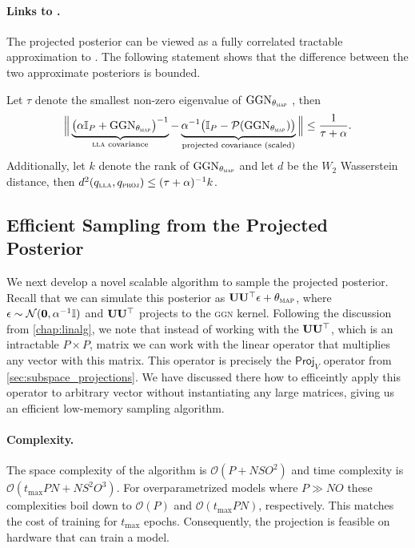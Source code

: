 \paragraph{Links to \LLA.}
The projected posterior can be viewed as a fully correlated tractable approximation to \LLA. The following statement shows that the difference between the two approximate posteriors is bounded.
\begin{lemma}\label{lm:null:error_bound}
   Let $\tau$ denote the smallest non-zero eigenvalue of $\mathrm{GGN}_{\theta_{\textsc{map}}}$ \citep{nguyen2021tight}, then
\begin{equation*}
    \Big\|
    \underbrace{\big(\alpha \mathbb{I}_P + \mathrm{GGN}_{\theta_{\textsc{map}}}\big)^{-1}}_{\textnormal{\textsc{lla}\ covariance}}
    -
    \underbrace{\alpha^{-1}\big(\mathbb{I}_P - \mathcal{P}(\mathrm{GGN}_{\theta_{\textsc{map}}})\big)}_{\textnormal{projected covariance (scaled)}}
    \Big\|
    \leq
    \frac{1}{\tau + \alpha}.
\end{equation*}
Additionally, let $k$ denote the rank of $\mathrm{GGN}_{\theta_{\textsc{map}}}$ and let $d$ be the $W_2$ Wasserstein distance, then $d^2(q_{\textnormal{\textsc{lla}}}, q_{\textnormal{\textsc{proj}}}) \leq (\tau + \alpha)^{-1} k$.
\end{lemma}

\subsection{Efficient Sampling from the Projected Posterior}

We next develop a novel scalable algorithm to sample the projected posterior.
Recall that we can simulate this posterior as $\mathbf{U} \mathbf{U}^{\top} \epsilon + \theta_{\textnormal{\textsc{map}}}$, where $\epsilon \sim \mathcal{N}(\mathbf{0}, \alpha^{-1}\mathbb{I})$ and $\mathbf{U}\mathbf{U}^{\top}$ projects to the \textsc{ggn} kernel. Following the discussion from \cref{chap:linalg}, we note that instead of working with the $\mathbf{U}\mathbf{U}^{\top} $, which is an intractable $P \times P$, matrix we can work with the linear operator that multiplies any vector with this matrix. This operator is precisely the $ \textsf{Proj}_V$ operator from \cref{sec:subspace_projections}. We have discussed there how to efficeintly apply this operator to arbitrary vector without instantiating any large matrices, giving us an efficient low-memory sampling algorithm.

\paragraph{Complexity.} The space complexity of the algorithm is $\mathcal{O}(P + NSO^2)$ and time complexity is $\mathcal{O}(t_{\max}PN+N S^2 O^3)$. For overparametrized models where $P \gg NO$ these complexities boil down to $\mathcal{O}(P)$ and $\mathcal{O}(t_{\max}PN)$, respectively. This matches the cost of training for $t_{\max}$ epochs.
Consequently, the projection is feasible on hardware that can train a model.


